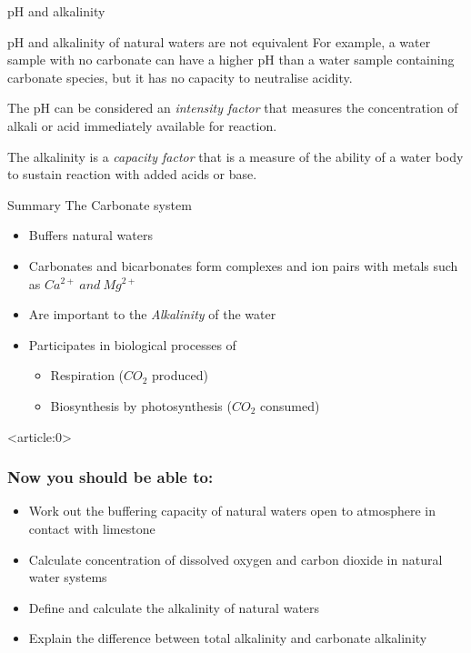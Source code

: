 \documentclass[a4paper,titlepage]{article}
\begin{document}
\begin{frame}{pH and alkalinity}
\begin{alertblock}{pH and alkalinity of natural waters are not equivalent}
For example, a water sample with no carbonate can have a higher pH than a water sample
containing carbonate species, but it has no capacity to neutralise acidity. 

\medskip The pH can be considered an \emph{intensity factor} that
measures the concentration of alkali or acid immediately available for
reaction. 

\medskip The alkalinity is a \emph{capacity factor} that is a measure
of the ability of a water body to sustain reaction with added acids or
base.
\end{alertblock}
\end{frame}

\begin{frame}{Summary The Carbonate system}
\begin{itemize}
\item  Buffers natural waters
\item Carbonates and bicarbonates form complexes and ion pairs with metals such as
\(Ca^{2+}\ and\ Mg^{2+}\) 
\item Are important to the \emph{Alkalinity} of the
water 
\item Participates in biological processes of 
\begin{itemize}
\item Respiration (\(CO_2\) produced) 
\item Biosynthesis by photosynthesis (\(CO_2\) consumed)
\end{itemize}
\end{itemize}
\end{frame}

\begin{frame}<article:0>
\frametitle{Now you should be able to:}
\begin{itemize}
\item Work out the buffering capacity of natural waters open to atmosphere in contact with limestone
\item Calculate concentration of dissolved oxygen and carbon dioxide in natural water systems
\item Define and calculate the alkalinity of natural waters
\item Explain the difference between total alkalinity and carbonate alkalinity
\end{itemize}
\end{frame}
\end{document}
